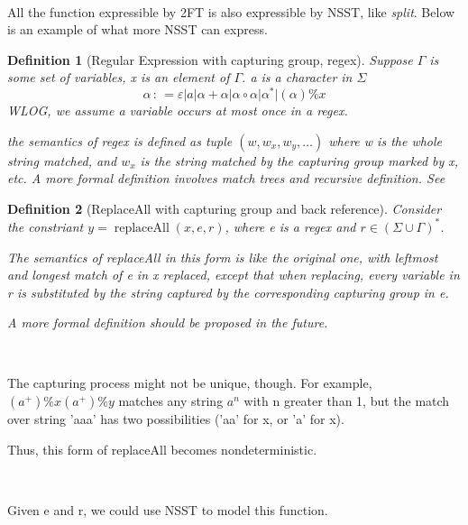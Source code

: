 \documentclass{article}
\newcommand{\colons}{\,:\,}
\newcommand{\tmop}[1]{\ensuremath{\operatorname{#1}}}
\newcommand{\tmtextit}[1]{{\itshape{#1}}}
\newtheorem{definition}{Definition}
{\theorembodyfont{\rmfamily}\newtheorem{note}{Note}}
{\theorembodyfont{\rmfamily}\newtheorem{remark}{Remark}}
\begin{document}
\

All the function expressible by 2FT is also expressible by NSST, like
\tmtextit{split}. Below is an example of what more NSST can express.

\begin{definition}[Regular Expression with capturing group, regex]
  Suppose $\Gamma$ is some set of variables, x is an element of $\Gamma$. a is
  a character in $\Sigma$
  \[ \alpha \colons = \varepsilon |a| \alpha + \alpha | \alpha \circ \alpha |
     \alpha^{\ast} | (\alpha) \%x \]
  WLOG, we assume a variable occurs at most once in a regex.
  
  the semantics of regex is defined as tuple $(w, w_x, w_y, \ldots)$ where w
  is the whole string matched, and $w_x$ is the string matched by the
  capturing group marked by x, etc. A more formal definition involves match
  trees and recursive definition.
  See{\cite{campeanuFORMALSTUDYPRACTICAL2003,carleExtendedRegularExpressions2009}}
\end{definition}

\begin{definition}[ReplaceAll with capturing group and back reference]
  Consider the constriant $y = \tmop{replaceAll} (x, e, r)$, where e is a
  regex and $r \in (\Sigma \cup \Gamma)^{\ast}$.
  
  The semantics of replaceAll in this form is like the original
  one{\cite{chenWhatDecidableString2018}}, with leftmost and longest match of
  e in x replaced, except that when replacing, every variable in r is
  substituted by the string captured by the corresponding capturing group in
  e.
  
  A more formal definition should be proposed in the future.
\end{definition}

\begin{note}
  \
  
  The capturing process might not be unique, though. For example, $(a^+) \%x
  (a^+) \%y$ matches any string $a^n$ with n greater than 1, but the match
  over string 'aaa' has two possibilities ('aa' for x, or 'a' for x).
  
  Thus, this form of replaceAll becomes nondeterministic.
\end{note}

\

\begin{remark}
  Given e and r, we could use NSST to model this function.
\end{remark}
\end{document}

